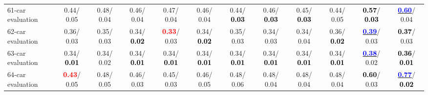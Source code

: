 \begin{table}[h]
\begin{center}
{\begin{tabular}{lc|c|c|c|c|c|c|c|c|c|c}
61-car evaluation &   0.44/  0.05 &   0.48/  0.04 &   0.46/  0.04 &   0.47/  0.04 &   0.46/  0.04 &   0.44/\textcolor{black}{\textbf{  0.03}} &   0.46/\textcolor{black}{\textbf{  0.03}} &   0.45/\textcolor{black}{\textbf{  0.03}} &   0.44/  0.05 & \textcolor{black}{\textbf{  0.57}}/\textcolor{black}{\textbf{  0.03}} & \underline{\textcolor{blue}{\textbf{  0.60}}}/  0.04 \\
62-car evaluation &   0.36/  0.03 &   0.35/  0.03 &   0.34/\textcolor{black}{\textbf{  0.02}} & \textcolor{red}{\textbf{  0.33}}/  0.03 &   0.34/\textcolor{black}{\textbf{  0.02}} &   0.35/  0.03 &   0.34/  0.03 &   0.34/  0.04 &   0.36/\textcolor{black}{\textbf{  0.02}} & \underline{\textcolor{blue}{\textbf{  0.39}}}/  0.03 & \textcolor{black}{\textbf{  0.37}}/  0.03 \\
63-car evaluation &   0.34/\textcolor{black}{\textbf{  0.01}} &   0.34/  0.02 &   0.34/\textcolor{black}{\textbf{  0.01}} &   0.34/\textcolor{black}{\textbf{  0.01}} &   0.34/\textcolor{black}{\textbf{  0.01}} &   0.34/\textcolor{black}{\textbf{  0.01}} &   0.34/\textcolor{black}{\textbf{  0.01}} &   0.34/\textcolor{black}{\textbf{  0.01}} &   0.34/\textcolor{black}{\textbf{  0.01}} & \underline{\textcolor{blue}{\textbf{  0.38}}}/  0.02 & \textcolor{black}{\textbf{  0.36}}/\textcolor{black}{\textbf{  0.01}} \\
64-car evaluation & \textcolor{red}{\textbf{  0.43}}/  0.05 &   0.48/  0.05 &   0.46/  0.03 &   0.45/  0.03 &   0.46/  0.05 &   0.48/  0.06 &   0.48/  0.04 &   0.48/  0.04 &   0.48/  0.04 & \textcolor{black}{\textbf{  0.60}}/  0.03 & \underline{\textcolor{blue}{\textbf{  0.77}}}/\textcolor{black}{\textbf{  0.02}} \\\end{tabular}}\label{stratsALCKappa1Allalla}
\end{center}
\end{table}

